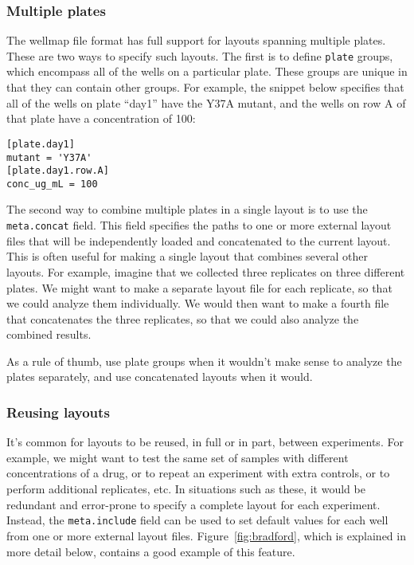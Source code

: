 \documentclass{bmcart}
\begin{document}
\subsubsection*{Multiple plates}

The wellmap file format has full support for layouts spanning multiple
plates. These are two ways to specify such layouts. The first is to
define \texttt{plate} groups, which encompass all of the wells on a particular
plate. These groups are unique in that they can contain other groups.
For example, the snippet below specifies that all of the wells on
plate ``day1'' have the Y37A mutant, and the wells on row A of that
plate have a concentration of \SI{100}{\ugmL}:

\begin{lstlisting}
[plate.day1]
mutant = 'Y37A'
[plate.day1.row.A]
conc_ug_mL = 100
\end{lstlisting}

The second way to combine multiple plates in a single layout is to
use the \texttt{meta.concat} field. This field specifies the paths
to one or more external layout files that will be independently loaded
and concatenated to the current layout. This is often useful for making
a single layout that combines several other layouts. For example,
imagine that we collected three replicates on three different plates.
We might want to make a separate layout file for each replicate, so
that we could analyze them individually. We would then want to make
a fourth file that concatenates the three replicates, so that we could
also analyze the combined results.

As a rule of thumb, use plate groups when it wouldn't make sense to
analyze the plates separately, and use concatenated layouts when it
would.

\subsubsection*{Reusing layouts}

It's common for layouts to be reused, in full or in part, between
experiments. For example, we might want to test the same set of samples
with different concentrations of a drug, or to repeat an experiment
with extra controls, or to perform additional replicates, etc. In
situations such as these, it would be redundant and error-prone to
specify a complete layout for each experiment. Instead, the \texttt{meta.include}
field can be used to set default values for each well from one or
more external layout files. Figure~\ref{fig:bradford}, which is
explained in more detail below, contains a good example of this feature.
\end{document}
